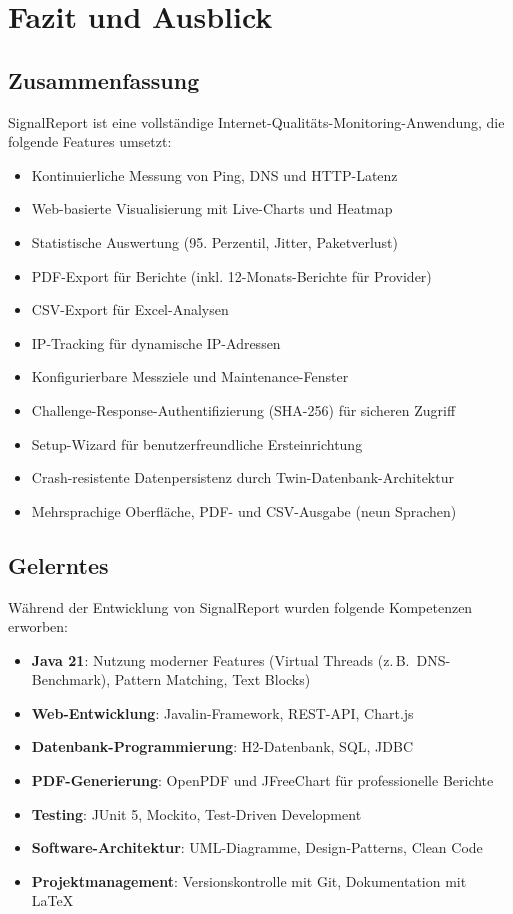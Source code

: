 \section{Fazit und Ausblick}
\label{sec:fazit}

\subsection{Zusammenfassung}
SignalReport ist eine vollständige Internet-Qualitäts-Monitoring-Anwendung, die folgende Features umsetzt:

\begin{itemize}
    \item Kontinuierliche Messung von Ping, DNS und HTTP-Latenz
    \item Web-basierte Visualisierung mit Live-Charts und Heatmap
    \item Statistische Auswertung (95. Perzentil, Jitter, Paketverlust)
    \item PDF-Export für Berichte (inkl. 12-Monats-Berichte für Provider)
    \item CSV-Export für Excel-Analysen
    \item IP-Tracking für dynamische IP-Adressen
    \item Konfigurierbare Messziele und Maintenance-Fenster
    \item Challenge-Response-Authentifizierung (SHA-256) für sicheren Zugriff
    \item Setup-Wizard für benutzerfreundliche Ersteinrichtung
    \item Crash-resistente Datenpersistenz durch Twin-Datenbank-Architektur
    \item Mehrsprachige Oberfläche, PDF- und CSV-Ausgabe (neun Sprachen)
\end{itemize}

\subsection{Gelerntes}
Während der Entwicklung von SignalReport wurden folgende Kompetenzen erworben:

\begin{itemize}
    \item \textbf{Java 21}: Nutzung moderner Features (Virtual Threads (z.\,B.\ DNS-Benchmark), Pattern Matching, Text Blocks)
    \item \textbf{Web-Entwicklung}: Javalin-Framework, REST-API, Chart.js
    \item \textbf{Datenbank-Programmierung}: H2-Datenbank, SQL, JDBC
    \item \textbf{PDF-Generierung}: OpenPDF und JFreeChart für professionelle Berichte
    \item \textbf{Testing}: JUnit 5, Mockito, Test-Driven Development
    \item \textbf{Software-Architektur}: UML-Diagramme, Design-Patterns, Clean Code
    \item \textbf{Projektmanagement}: Versionskontrolle mit Git, Dokumentation mit LaTeX
\end{itemize}

